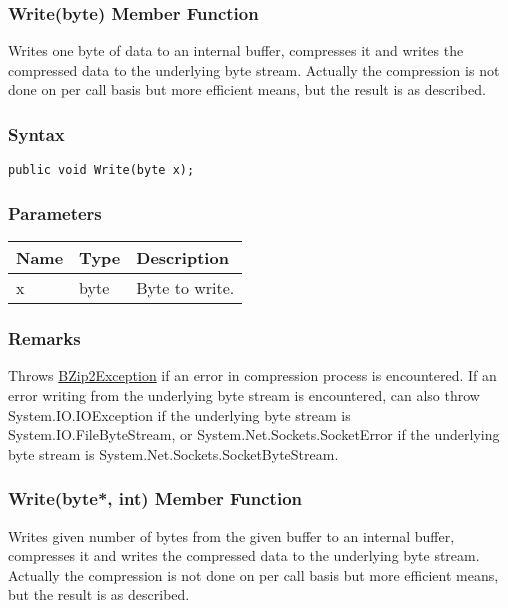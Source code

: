 \documentclass[a4paper,oneside,11.000000pt]{book}
\begin{document}
\hypertarget{System.IO.Compression.BZip2Stream.Write.P.System.IO.Compression.BZip2Stream.byte}{\subsubsection*{Write(byte) Member Function}}
\begin{flushleft}
Writes one byte of data to an internal buffer, compresses it and writes the compressed data
to the underlying byte stream.
Actually the compression is not done on per call basis but more efficient means, but
the result is as described.

\end{flushleft}
\subsubsection*{Syntax}\texttt{public void Write(byte x);}

\subsubsection*{Parameters}
\begin{flushleft}
\begin{supertabular}[l]{lll}
\textbf{Name}
& \textbf{Type}
& \textbf{Description}
\\
\hline
x
& byte
& Byte to write.

\\
\end{supertabular}

\end{flushleft}
\subsubsection*{Remarks}
\begin{flushleft}
Throws \hyperlink{System.IO.Compression.BZip2Exception}{BZip2Exception} if an error in compression process is encountered.
If an error writing from the underlying byte stream is encountered,
can also throw System.\-IO.\-IOException if the underlying byte stream is System.\-IO.\-FileByteStream, or
System.\-Net.\-Sockets.\-SocketError if the underlying byte stream is System.\-Net.\-Sockets.\-SocketByteStream.

\end{flushleft}
\clearpage

\hypertarget{System.IO.Compression.BZip2Stream.Write.P.System.IO.Compression.BZip2Stream.P.byte.int}{\subsubsection*{Write(byte*, int) Member Function}}
\begin{flushleft}
Writes given number of bytes from the given buffer to an internal buffer,
compresses it and writes the compressed data to the underlying byte stream.
Actually the compression is not done on per call basis but more efficient means, but
the result is as described.

\end{flushleft}
\end{document}
